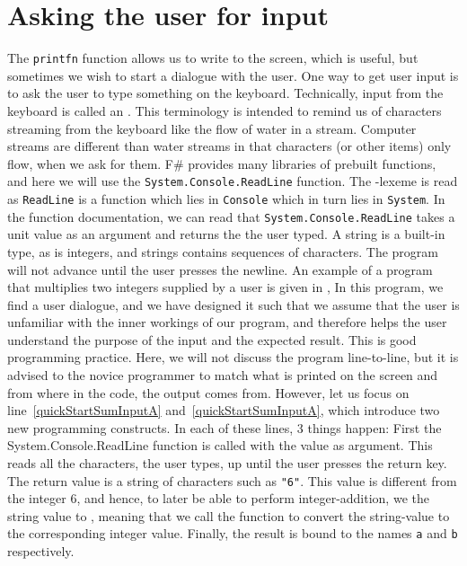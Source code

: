 \documentclass[fsharpNotes.tex]{subfiles}
\begin{document}
\section{Asking the user for input}
The \lstinline{printfn} function allows us to write to the screen, which is useful, but sometimes we wish to start a dialogue with the user. One way to get user input is to ask the user to type something on the keyboard. Technically, input from the keyboard is called an  . This terminology is intended to remind us of characters streaming from the keyboard like the flow of water in a stream. Computer streams are different than water streams in that characters (or other items) only flow, when we ask for them. F\# provides many libraries of prebuilt functions, and here we will use the \lstinline{System.Console.ReadLine} function. The -lexeme is read as \lstinline{ReadLine} is a function which lies in \lstinline{Console} which in turn lies in \lstinline{System}. In the function documentation, we can read that \lstinline{System.Console.ReadLine} takes a unit value as an argument and returns the  the user typed. A string is a built-in type, as is integers, and strings contains sequences of characters. The program will not advance until the user presses the newline. An example of a program that multiplies two integers supplied by a user is given in ,
% 
%
In this program, we find a user dialogue, and we have designed it such that we assume that the user is unfamiliar with the inner workings of our program, and therefore helps the user understand the purpose of the input and the expected result. This is good programming practice. Here, we will not discuss the program line-to-line, but it is advised to the novice programmer to match what is printed on the screen and from where in the code, the output comes from. However, let us focus on line~\ref{quickStartSumInputA} and~\ref{quickStartSumInputA}, which introduce two new programming constructs. In each of these lines, 3 things happen: First the System.Console.ReadLine function is called with the \lexeme{()} value as argument. This reads all the characters, the user types, up until the user presses the return key. The return value is a string of characters such as \lstinline{"6"}. This value is different from the integer 6, and hence, to later be able to perform integer-addition, we  the string value to , meaning that we call the function  to convert the string-value to the corresponding integer value. Finally, the result is bound to the names \lstinline{a} and \lstinline{b} respectively.
\end{document}
